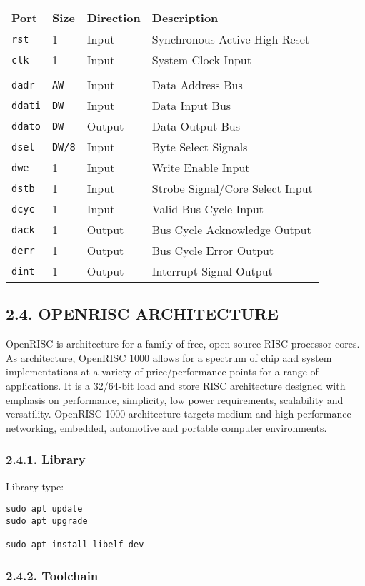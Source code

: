 \documentclass[]{article}
\begin{document}
\begin{longtable}[]{@{}llll@{}}
\toprule
Port & Size & Direction & Description\tabularnewline
\midrule
\endhead
\texttt{rst} & 1 & Input & Synchronous Active High Reset\tabularnewline
\texttt{clk} & 1 & Input & System Clock Input\tabularnewline
& & &\tabularnewline
\texttt{dadr} & \texttt{AW} & Input & Data Address Bus\tabularnewline
\texttt{ddati} & \texttt{DW} & Input & Data Input Bus\tabularnewline
\texttt{ddato} & \texttt{DW} & Output & Data Output Bus\tabularnewline
\texttt{dsel} & \texttt{DW/8} & Input & Byte Select
Signals\tabularnewline
\texttt{dwe} & 1 & Input & Write Enable Input\tabularnewline
\texttt{dstb} & 1 & Input & Strobe Signal/Core Select
Input\tabularnewline
\texttt{dcyc} & 1 & Input & Valid Bus Cycle Input\tabularnewline
\texttt{dack} & 1 & Output & Bus Cycle Acknowledge Output\tabularnewline
\texttt{derr} & 1 & Output & Bus Cycle Error Output\tabularnewline
\texttt{dint} & 1 & Output & Interrupt Signal Output\tabularnewline
\bottomrule
\end{longtable}

\subsection{2.4. OPENRISC ARCHITECTURE}\label{openrisc-architecture}

OpenRISC is architecture for a family of free, open source RISC
processor cores. As architecture, OpenRISC 1000 allows for a spectrum of
chip and system implementations at a variety of price/performance points
for a range of applications. It is a 32/64-bit load and store RISC
architecture designed with emphasis on performance, simplicity, low
power requirements, scalability and versatility. OpenRISC 1000
architecture targets medium and high performance networking, embedded,
automotive and portable computer environments.

\subsubsection{2.4.1. Library}\label{library}

Library type:

\begin{verbatim}
sudo apt update
sudo apt upgrade

sudo apt install libelf-dev
\end{verbatim}

\subsubsection{2.4.2. Toolchain}\label{toolchain}
\end{document}
